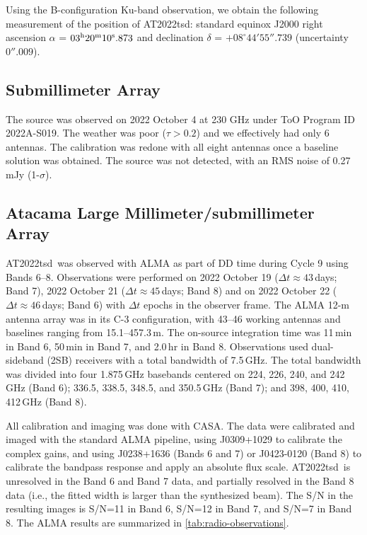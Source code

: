 \documentclass{nature_plusfigure}
\newcommand{\at}{AT2022tsd}
\begin{document}
\begin{methods}
Using the B-configuration Ku-band observation, we obtain the following measurement of the position of \at:
standard equinox J2000 right ascension $\alpha$ =
$03^{\rm{h}}20^{\rm{m}}10^{\rm{s}}.873$
and declination $\delta$ = $+08^{\circ} 44' 55''.739$ 
(uncertainty $0''.009$).

\subsection{Submillimeter Array}
\label{Methods:SMA}

The source was observed on 2022 October 4 at 230 GHz under ToO Program ID 2022A-S019.
The weather was poor ($\tau > 0.2$) and we effectively had only 6 antennas. The calibration was redone with all eight antennas once a baseline solution was obtained. The source was not detected, with an RMS noise of 0.27\,mJy (1-$\sigma$).

\subsection{Atacama Large Millimeter/submillimeter Array}
\label{sec:ALMA}

\at\ was observed with ALMA as part of DD time during Cycle 9 using Bands 6--8. Observations were performed on 2022 October 19 ($\Delta t \approx 43$\,days; Band 7), 2022 October 21 ($\Delta t \approx 45$\,days; Band 8) and on 2022 October 22 ($\Delta t \approx 46$\,days; Band 6) with $\Delta t$ epochs in the observer frame. The ALMA 12-m antenna array was in its C-3 configuration, with
43--46 working antennas and baselines ranging from 15.1--457.3\,m. The on-source integration time was
11\,min in Band 6, 50\,min in Band 7, and 2.0\,hr in Band 8.
Observations used dual-sideband (2SB) receivers with a total bandwidth of 7.5\,GHz. The total bandwidth was divided into four 1.875\,GHz basebands centered on 224, 226, 240, and 242\,GHz (Band 6);
336.5, 338.5, 348.5, and 350.5\,GHz (Band 7);
and 398, 400, 410, 412\,GHz (Band 8).


All calibration and imaging was done with CASA.
The data were calibrated and imaged
with the standard ALMA pipeline, using J0309+1029 to calibrate the complex gains, and using J0238+1636 (Bands 6 and 7) or J0423-0120 (Band 8) to calibrate the bandpass response and apply an absolute flux scale.
\at\ is unresolved in the Band 6 and Band 7 data, and partially resolved in the Band 8 data (i.e., the fitted width is larger than the synthesized beam).
The S/N in the resulting images is S/N=11 in Band 6, S/N=12 in Band 7, and S/N=7 in Band 8.
The ALMA results are summarized in \ref{tab:radio-observations}.


\end{methods}
\end{document}
